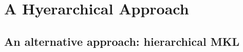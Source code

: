 \chapter{A Hyerarchical Approach}
\label{AppendixA}


\section{An alternative approach: hierarchical MKL}
\label{subsec:hierarchy}



